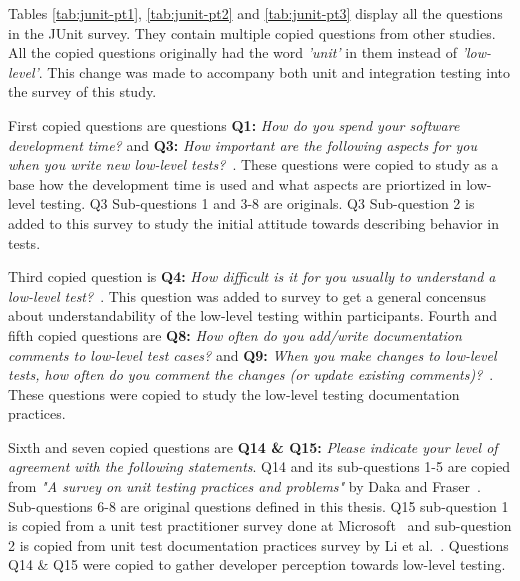 \restoregeometry
Tables \ref{tab:junit-pt1}, \ref{tab:junit-pt2} and \ref{tab:junit-pt3} display all the questions in the JUnit survey.
They contain multiple copied questions from other
studies. All the copied questions originally had the word \textit{'unit'} in them instead of \textit{'low-level'}. This change
was made to accompany both unit and integration testing into the survey of this study.

First copied questions are questions \textbf{Q1:} \textit{How do you spend your software development time?} and
\textbf{Q3:} \textit{How important are the following aspects for you when you write new low-level tests?}~\cite{daka2014survey}.
These questions were copied to study as a base how the development time is used and what aspects are priortized in low-level testing.
Q3 Sub-questions 1 and 3-8 are originals. Q3 Sub-question 2 is added to this survey to study the initial attitude towards describing behavior
in tests.

Third copied question is \textbf{Q4:} \textit{How difficult is it for you usually to understand a low-level test?}~\cite{li2016automatically}.
This question was added to survey to get a general concensus about understandability of the low-level testing within participants.
Fourth and fifth copied questions are \textbf{Q8:} \textit{How often do you add/write documentation comments to low-level test cases?} and
\textbf{Q9:} \textit{When you make changes to low-level tests, how often do you comment the changes (or update existing comments)?}~\cite{li2016automatically}.
These questions were copied to study the low-level testing documentation practices.

Sixth and seven copied questions are \textbf{Q14 \& Q15:} \textit{Please indicate your level of agreement with the following statements}.
Q14 and its sub-questions 1-5 are copied from \textit{"A survey on unit testing practices and problems"} by Daka and Fraser~\cite{daka2014survey}.
Sub-questions 6-8 are original questions defined in this thesis. Q15 sub-question 1 is copied from a unit test practitioner
survey done at Microsoft~\cite{williams2009effectiveness} and sub-question 2 is copied from unit test documentation
practices survey by Li et al.~\cite{li2016automatically}. Questions Q14 \& Q15 were copied to gather developer perception
towards low-level testing.


